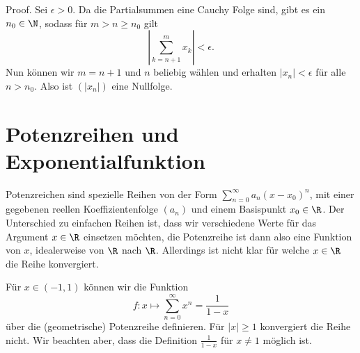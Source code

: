 \documentclass[letterpaper,10pt,english]{jupyterBook}
\begin{document}
\begin{emphBox}{}{}
Proof.  Sei \(\epsilon >0 \). Da die Partialsummen eine Cauchy Folge sind, gibt es ein \(n_0 \in \N\), sodass für \(m>n\geq n_0\) gilt
\begin{equation*}
|\sum_{k=n+1}^m x_k| < \epsilon.
\end{equation*}
Nun können wir \(m=n+1\) und \(n\) beliebig wählen und erhalten \(|x_n|<\epsilon\) für alle \(n > n_0\). Also ist \((|x_n|)\)
eine Nullfolge.
\end{emphBox}


\section{Potenzreihen und Exponentialfunktion}
\label{\detokenize{metrik/potenzreihen:potenzreihen-und-exponentialfunktion}}\label{\detokenize{metrik/potenzreihen::doc}}
Potenzreichen sind spezielle Reihen von der Form \(\sum_{n=0}^\infty a_n (x-x_0)^n\), mit einer gegebenen reellen Koeffizientenfolge \((a_n)\) und einem Basispunkt \(x_0 \in \R\). Der Unterschied zu einfachen Reihen ist, dass wir verschiedene Werte für das Argument \(x\in \R\) einsetzen möchten, die Potenzreihe ist dann also eine Funktion von \(x\), idealerweise von \(\R\) nach \(\R\). Allerdings ist nicht klar für welche \(x \in \R\) die Reihe konvergiert.
\label{metrik/potenzreihen:example-0}
\begin{example}{}{}



Für \(x \in (-1,1)\) können wir die Funktion
\begin{equation*}
 f: x \mapsto \sum_{n=0}^\infty x^n = \frac{1}{1-x}
\end{equation*}
über die (geometrische) Potenzreihe definieren. Für \(|x| \geq 1\) konvergiert die Reihe nicht. Wir beachten aber, dass die Definition \(\frac{1}{1-x}\) für \(x\neq 1\) möglich ist.
\end{example}
\end{document}
